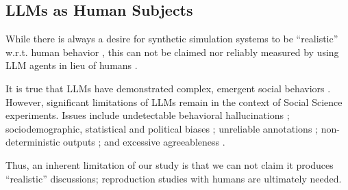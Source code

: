 \subsection{LLMs as Human Subjects}
\label{ssec:related:human-llm}

While there is always a desire for synthetic simulation systems to be ``realistic'' w.r.t. human behavior \citep{grossman_2023, tornberg_2023, argyle2023}, this can not be claimed nor reliably measured by using LLM agents in lieu of humans \citep{rossi_2024}.

It is true that LLMs have demonstrated complex, emergent social behaviors \cite{park2023game, demarzo_2023, leng_2024, abdelnabi_negotiations, abramski_2023, hewitt2024predicting, park2024generativeagentsimulations1000}. However, significant limitations of LLMs remain in the context of Social Science experiments. Issues include undetectable behavioral hallucinations \cite{rossi_2024}; sociodemographic, statistical and political biases \cite{anthis_2025,hewitt2024predicting,rossi_2024, Taubenfeld2024SystematicBI}; unreliable annotations \cite{jansen_2023,bisbee_2023,neumann_2025, Gligoric2024CanUL}; non-deterministic outputs \cite{atil_2025, bisbee_2023}; and excessive agreeableness \cite{Park2023GenerativeAI, anthis_2025, rossi_2024}.

Thus, an inherent limitation of our study is that we can not claim it produces ``realistic'' discussions; reproduction studies with humans are ultimately needed.